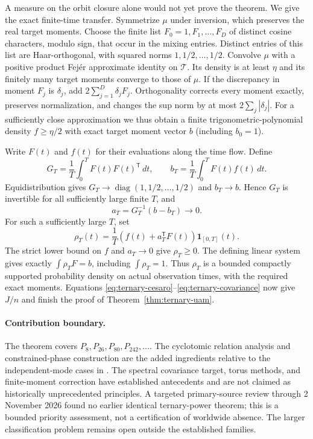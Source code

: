 \documentclass[11pt,a4paper]{article}
\theoremstyle{definition}\newtheorem{definition}[theorem]{Definition}
\theoremstyle{remark}\newtheorem{remark}[theorem]{Remark}
\begin{document}
A measure on the orbit closure alone would not yet prove the theorem.
We give the exact finite-time transfer. Symmetrize $\mu$ under inversion,
which preserves the real target moments. Choose the finite list
$F_0=1,F_1,\ldots,F_D$ of distinct cosine characters, modulo sign,
that occur in the mixing entries. Distinct entries of this list are
Haar-orthogonal, with squared norms $1,1/2,\ldots,1/2$.
Convolve $\mu$ with a positive product Fej\'er approximate identity
on $\mathcal T$. Its density is at least $\eta$ and its finitely
many target moments converge to those of $\mu$. If the discrepancy
in moment $F_j$ is $\delta_j$, add $2\sum_{j=1}^D\delta_jF_j$.
Orthogonality corrects every moment exactly, preserves normalization,
and changes the sup norm by at most $2\sum_j|\delta_j|$.
For a sufficiently close approximation we thus obtain a finite
trigonometric-polynomial density $f\ge\eta/2$ with exact target
moment vector $b$ (including $b_0=1$).

Write $F(t)$ and $f(t)$ for their evaluations along the time flow.
Define
\[
 G_T=\frac1T\int_0^T F(t)F(t)^{\mathsf T}\,dt,
 \qquad b_T=\frac1T\int_0^T F(t)f(t)\,dt.
\]
Equidistribution gives
\(G_T\to\operatorname{diag}(1,1/2,\ldots,1/2)\) and
$b_T\to b$. Hence $G_T$ is invertible for all sufficiently large
finite $T$, and
\[
 a_T=G_T^{-1}(b-b_T)\longrightarrow0.
\]
For such a sufficiently large $T$, set
\[
 \rho_T(t)=\frac1T\left(f(t)+a_T^{\mathsf T}F(t)\right)
 \mathbf1_{[0,T]}(t).
\]
The strict lower bound on $f$ and $a_T\to0$ give $\rho_T\ge0$.
The defining linear system gives exactly
\(\int\rho_TF=b\), including \(\int\rho_T=1\).
Thus $\rho_T$ is a bounded compactly supported probability density
on actual observation times, with the required exact moments.
Equations \eqref{eq:ternary-cesaro}--\eqref{eq:ternary-covariance}
now give $J/n$ and finish the proof of
Theorem~\ref{thm:ternary-uam}.

\paragraph{Contribution boundary.}
The theorem covers $P_8,P_{26},P_{80},P_{242},\ldots$.
The cyclotomic relation analysis and constrained-phase construction are
the added ingredients relative to the independent-mode cases in
\cite{Kang2026}. The spectral covariance target, torus methods,
and finite-moment correction have established antecedents and are
not claimed as historically unprecedented principles. A targeted
primary-source review through 2 November 2026 found no earlier
identical ternary-power theorem; this is a bounded priority assessment,
not a certification of worldwide absence. The larger classification
problem remains open outside the established families.
\end{document}
